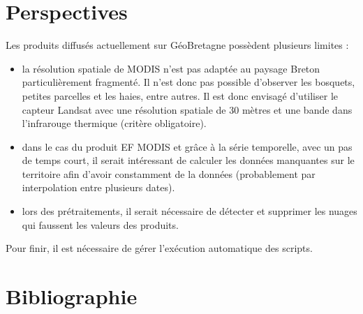 \documentclass[10pt,a4paper]{article}
\begin{document}
\section{Perspectives}

Les produits diffusés actuellement sur GéoBretagne possèdent plusieurs limites :
\begin{itemize}
\item la résolution spatiale de MODIS n'est pas adaptée au paysage Breton particulièrement fragmenté. Il n'est donc pas possible d'observer les bosquets, petites parcelles et les haies, entre autres. Il est donc envisagé d'utiliser le capteur Landsat avec une résolution spatiale de 30 mètres et une bande dans l'infrarouge thermique (critère obligatoire).
\item dans le cas du produit EF MODIS et grâce à la série temporelle, avec un pas de temps court, il serait intéressant de calculer les données manquantes sur le territoire afin d'avoir constamment de la données (probablement par interpolation entre plusieurs dates).
\item lors des prétraitements, il serait nécessaire de détecter et supprimer les nuages qui faussent les valeurs des produits.
\end{itemize}

Pour finir, il est nécessaire de gérer l'exécution automatique des scripts.

\section{Bibliographie}
\end{document}
